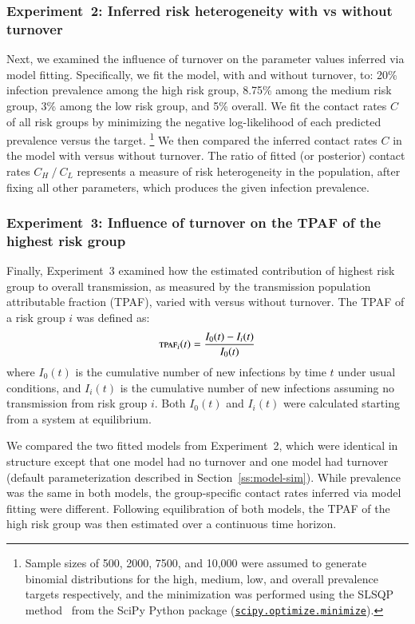 \subsubsection{Experiment~2: Inferred risk heterogeneity with vs without turnover}
\label{sss:exp-infer}
Next, we examined the influence of turnover on
the parameter values inferred via model fitting.
Specifically, we fit the model, with and without turnover, to:
20\% infection prevalence among the high risk group,
8.75\% among the medium risk group,
3\% among the low risk group,
and 5\% overall.
We fit the contact rates $C$ of all risk groups
by minimizing the negative log-likelihood of each predicted prevalence versus the target.%
\footnote{Sample sizes of 500, 2000, 7500, and 10,000 were assumed to generate binomial distributions
  for the high, medium, low, and overall prevalence targets respectively,
  and the minimization was performed using
  the SLSQP method~\citep{Kraft1988} from the SciPy Python package
  (\href{https://docs.scipy.org/doc/scipy/reference/generated/scipy.optimize.minimize.html}
  {\texttt{scipy.optimize.minimize}}).}
We then compared the inferred contact rates $C$
in the model with versus without turnover.
The ratio of fitted (or posterior) contact rates $C_H~/~C_L$
represents a measure of risk heterogeneity in the population,
after fixing all other parameters,
which produces the given infection prevalence.
\subsubsection{Experiment~3: Influence of turnover on the TPAF of the highest risk group}
\label{sss:exp-tpaf}
Finally, Experiment~3 examined how
the estimated contribution of highest risk group to overall transmission,
as measured by the transmission population attributable fraction (TPAF),
varied with versus without turnover.
The TPAF of a risk group $i$ was defined as:
\begin{equation}
\textsc{tpaf}_i(t) = \frac{I_0(t) - I_i(t)}{I_0(t)}
\end{equation}
where $I_0(t)$ is the cumulative number of new infections
by time $t$ under usual conditions,
and $I_i(t)$ is the cumulative number of new infections
assuming no transmission from risk group $i$.
Both $I_0(t)$ and $I_i(t)$ were calculated
starting from a system at equilibrium.
\par
We compared the two fitted models from Experiment~2,
which were identical in structure except that
one model had no turnover and one model had turnover
(default parameterization described in Section~\ref{ss:model-sim}).
While prevalence was the same in both models,
the group-specific contact rates inferred via model fitting were different.
Following equilibration of both models,
the TPAF of the high risk group was then estimated over a continuous time horizon.
